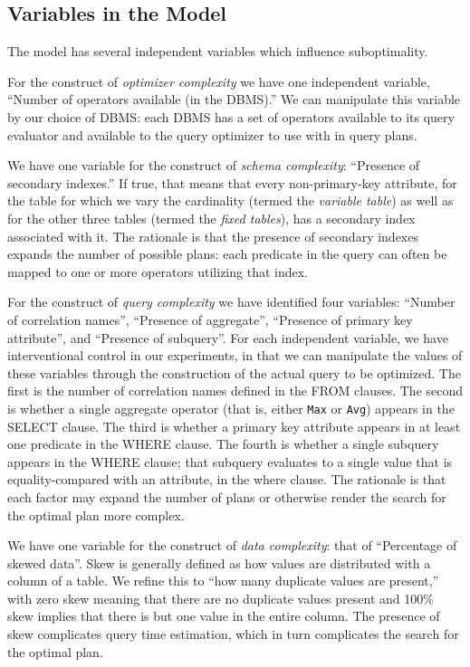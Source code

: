 \documentclass[prodmode,acmtods]{acmsmall}
\begin{document}
\subsection{Variables in the Model}
The model has several independent
variables which influence suboptimality.

For the construct of {\em optimizer
complexity} we have one independent variable, ``\hbox{Number} of operators
available (in the \hbox{DBMS}).'' We can manipulate this variable by our choice of
\hbox{DBMS}: each \hbox{DBMS} has a set of operators available to its query
evaluator and available to the query optimizer to use with in query plans.

We have one variable for the construct of {\em schema complexity}:
``Presence of secondary indexes.'' If true, that means that every
non-primary-key attribute, for the table for which we vary the cardinality
(termed the {\em variable table}) as well as for the other three tables
(termed the {\em fixed
tables}), has a secondary index associated with it. The rationale is that the
presence of secondary indexes expands the number of possible plans: each
predicate in the query can often be mapped to one or more operators
utilizing that index.

For the construct of {\em query complexity} we have identified four
variables: ``Number of correlation names'', ``Presence of aggregate'',
``Presence of primary key attribute'', and ``Presence of subquery''. For each independent
variable, we have interventional control in our experiments, in that we can
manipulate the values of these variables through the construction of the
actual query to be optimized. The first is the number of correlation names
defined in the FROM clauses. The second is whether a single aggregate operator
(that is, either {\tt Max} or {\tt Avg}) appears in the SELECT clause.
The third
is whether a primary key attribute appears in at least one predicate in the
WHERE clause. The fourth is whether a single subquery appears in the
WHERE clause; that subquery evaluates to a single value that is
equality-compared with an attribute, in the where clause. The rationale is
that each factor may expand the number of plans or otherwise render the search for
the optimal plan more complex.

We have one variable for the construct of {\em data complexity}: that of
``Percentage of skewed data''.  Skew is generally defined as how values are
distributed with a column of a table. We refine this to ``how many duplicate
values are present,'' with zero skew meaning that there are no duplicate
values present and 100\% skew implies that there is but one value in the
entire column. The presence of skew complicates query time estimation, which
in turn complicates the search for the optimal plan.
\end{document}

